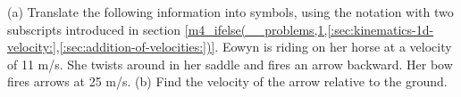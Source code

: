 (a) Translate the following information into symbols,
using the notation with two subscripts introduced
in section
\ref{m4_ifelse(__problems,1,[:sec:kinematics-1d-velocity:],[:sec:addition-of-velocities:])}.
Eowyn is riding on her horse at a velocity of 11 m/s.
She twists around in her saddle and fires an arrow backward.
Her bow fires arrows at 25 m/s. (b) Find the velocity of the
arrow relative to the ground.
